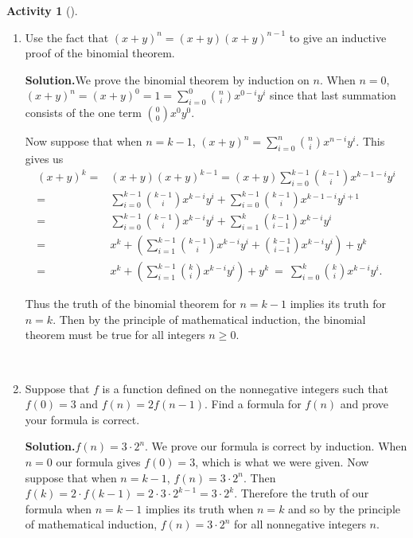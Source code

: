 \documentclass[10pt,]{book}
\theoremstyle{plain}
\theoremstyle{definition}
\newtheorem{activity}[project]{Activity}
\numberwithin{equation}{chapter}
\newcommand{\amp}{&}
\begin{document}
\begin{activity}[]\label{activity-73}
~\par
\begin{enumerate}[label=(\alph*)]
 \item Use the fact that \((x+y)^n = (x+y)(x+y)^{n-1}\) to give an inductive proof of the binomial theorem.%
\par\medskip\noindent%
\textbf{Solution.}\quad We prove the binomial theorem by induction on \(n\). When \(n=0\), \((x+y)^n=(x+y)^0=1=\sum_{i=0}^0 \binom{n}{i}x^{0-i}y^i\) since that last summation consists of the one term \(\binom{0}{0}x^0y^0\).%
\par
Now suppose that when \(n=k-1\), \((x+y)^n=\sum_{i=0}^n \binom{n}{i}x^{n-i}y^i.\) This gives us%
\begin{align*}
(x+y)^k =\amp (x+y)(x+y)^{k-1}=(x+y)\sum_{i=0}^{k-1}\binom{k-1}{i}x^{k-1-i}y^i\\
=\amp \sum_{i=0}^{k-1}\binom{k-1}{i}x^{k-i}y^i+\sum_{i=0}^{k-1} \binom{k-1}{i}x^{k-1-i}y^{i+1}\\
=\amp \sum_{i=0}^{k-1}\binom{k-1}{i}x^{k-i}y^i+\sum_{i=1}^{k} \binom{k-1}{i-1}x^{k-i}y^{i}\\
=\amp  x^k+\left(\sum_{i=1}^{k-1}\binom{k-1}{i}x^{k-i}y^i+\binom{k-1}{i-1}x^{k-i}y^i\right) +y^k\\
=\amp  x^k+\left(\sum_{i=1}^{k-1} \binom{k}{i}x^{k-i}y^i\right) +y^k\ =\
\sum_{i=0}^k \binom{k}{i}x^{k-i}y^i.
\end{align*}
%
\par
Thus the truth of the binomial theorem for \(n=k-1\) implies its truth for \(n=k\). Then by the principle of mathematical induction, the binomial theorem must be true for all integers \(n\ge 0\).%

~\par
\item Suppose that \(f\) is a function defined on the nonnegative integers such that \(f(0)=3\) and \(f(n)=2f(n-1)\). Find a formula for \(f(n)\) and prove your formula is correct.%
\par\medskip\noindent%
\textbf{Solution.}\quad \(f(n)=3\cdot2^n\). We prove our formula is correct by induction. When \(n=0\) our formula gives \(f(0)=3\), which is what we were given. Now suppose that when \(n=k-1\), \(f(n) =3\cdot2^n\). Then \(f(k)=2\cdot  f(k-1) =2\cdot 3\cdot2^{k-1}=3\cdot2^k\). Therefore the truth of our formula when \(n=k-1\) implies its truth when \(n=k\) and so by the principle of mathematical induction, \(f(n)=3\cdot 2^n\) for all nonnegative integers \(n\).%

\end{enumerate}
\end{activity}
\typeout{************************************************}
\typeout{************************************************}
\end{document}

